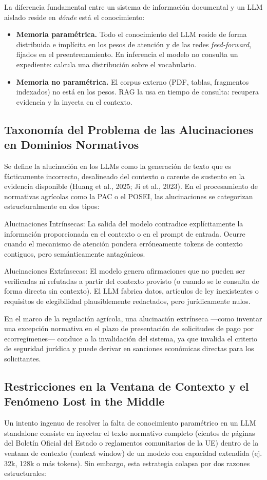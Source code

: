 La diferencia fundamental entre un sistema de información documental y un LLM aislado reside en \emph{dónde} está el conocimiento:

\begin{itemize}
  \item \textbf{Memoria paramétrica.} Todo el conocimiento del LLM reside de forma distribuida e implícita en los pesos de atención y de las redes \emph{feed-forward}, fijados en el preentrenamiento. En inferencia el modelo no consulta un expediente: calcula una distribución sobre el vocabulario.
  \item \textbf{Memoria no paramétrica.} El corpus externo (PDF, tablas, fragmentos indexados) no está en los pesos. RAG la usa en tiempo de consulta: recupera evidencia y la inyecta en el contexto.
\end{itemize}
\subsection{Taxonomía del Problema de las Alucinaciones en Dominios Normativos}
Se define la alucinación en los LLMs como la generación de texto que es fácticamente incorrecto, desalineado del contexto o carente de sustento en la evidencia disponible (Huang et al., 2025; Ji et al., 2023). En el procesamiento de normativas agrícolas como la PAC o el POSEI, las alucinaciones se categorizan estructuralmente en dos tipos:

Alucinaciones Intrínsecas: La salida del modelo contradice explícitamente la información proporcionada en el contexto o en el prompt de entrada. Ocurre cuando el mecanismo de atención pondera erróneamente tokens de contexto contiguos, pero semánticamente antagónicos.

Alucinaciones Extrínsecas: El modelo genera afirmaciones que no pueden ser verificadas ni refutadas a partir del contexto provisto (o cuando se le consulta de forma directa sin contexto). El LLM fabrica datos, artículos de ley inexistentes o requisitos de elegibilidad plausiblemente redactados, pero jurídicamente nulos.

En el marco de la regulación agrícola, una alucinación extrínseca ---como inventar una excepción normativa en el plazo de presentación de solicitudes de pago por ecorregímenes--- conduce a la invalidación del sistema, ya que invalida el criterio de seguridad jurídica y puede derivar en sanciones económicas directas para los solicitantes.

\subsection{Restricciones en la Ventana de Contexto y el Fenómeno Lost in the Middle}
Un intento ingenuo de resolver la falta de conocimiento paramétrico en un LLM standalone consiste en inyectar el texto normativo completo (cientos de páginas del Boletín Oficial del Estado o reglamentos comunitarios de la UE) dentro de la ventana de contexto (context window) de un modelo con capacidad extendida (ej. 32k, 128k o más tokens). Sin embargo, esta estrategia colapsa por dos razones estructurales:

